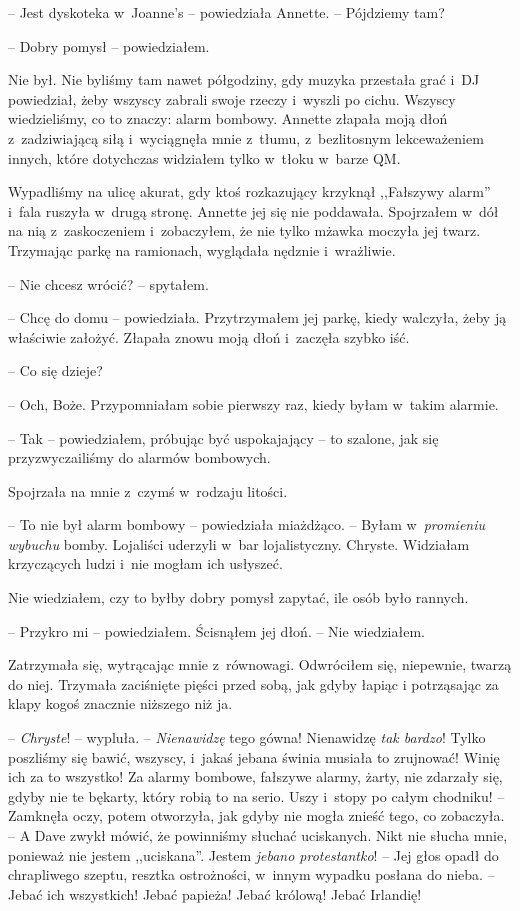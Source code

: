 \documentclass[oneside,polish,11pt,sfheadings]{mwbk}
\begin{document}
-- Jest dyskoteka w~Joanne's -- powiedziała Annette. -- Pójdziemy tam?

-- Dobry pomysł -- powiedziałem.

Nie był. Nie byliśmy tam nawet półgodziny, gdy muzyka przestała grać i~DJ powiedział, żeby wszyscy zabrali swoje rzeczy i~wyszli po cichu.
Wszyscy wiedzieliśmy, co to znaczy: alarm bombowy. Annette złapała moją
dłoń z~zadziwiającą siłą i~wyciągnęła mnie z~tłumu, z~bezlitosnym
lekceważeniem innych, które dotychczas widziałem tylko w~tłoku w~barze
QM.

Wypadliśmy na ulicę akurat, gdy ktoś rozkazujący krzyknął ,,Fałszywy
alarm'' i~fala ruszyła w~drugą stronę. Annette jej się nie poddawała.
Spojrzałem w~dół na nią z~zaskoczeniem i~zobaczyłem, że nie tylko mżawka
moczyła jej twarz. Trzymając parkę na ramionach, wyglądała nędznie i~wrażliwie.

-- Nie chcesz wrócić? -- spytałem.

-- Chcę do domu -- powiedziała. Przytrzymałem jej parkę, kiedy walczyła,
żeby ją właściwie założyć. Złapała znowu moją dłoń i~zaczęła szybko iść.

-- Co się dzieje?

-- Och, Boże. Przypomniałam sobie pierwszy raz, kiedy byłam w~takim
alarmie.

-- Tak -- powiedziałem, próbując być uspokajający -- to szalone, jak się
przyzwyczailiśmy do alarmów bombowych.

Spojrzała na mnie z~czymś w~rodzaju litości.

-- To nie był alarm bombowy -- powiedziała miażdżąco. -- Byłam w~\emph{promieniu wybuchu} bomby. Lojaliści uderzyli w~bar lojalistyczny.
Chryste. Widziałam krzyczących ludzi i~nie mogłam ich usłyszeć.

Nie wiedziałem, czy to byłby dobry pomysł zapytać, ile osób było
rannych.

-- Przykro mi -- powiedziałem. Ścisnąłem jej dłoń. -- Nie wiedziałem.

Zatrzymała się, wytrącając mnie z~równowagi. Odwróciłem się, niepewnie,
twarzą do niej. Trzymała zaciśnięte pięści przed sobą, jak gdyby łapiąc
i potrząsając za klapy kogoś znacznie niższego niż ja.

-- \emph{Chryste}! -- wypluła. -- \emph{Nienawidzę} tego gówna! Nienawidzę
\emph{tak bardzo}! Tylko poszliśmy się bawić, wszyscy, i~jakaś jebana
świnia musiała to zrujnować! Winię ich za to wszystko! Za alarmy
bombowe, fałszywe alarmy, żarty, nie zdarzały się, gdyby nie te bękarty,
który robią to na serio. Uszy i~stopy po całym chodniku! -- Zamknęła
oczy, potem otworzyła, jak gdyby nie mogła znieść tego, co zobaczyła. -- A Dave zwykł mówić, że powinniśmy słuchać uciskanych. Nikt nie słucha
mnie, ponieważ nie jestem ,,uciskana''. Jestem \emph{jebano protestantko}!
-- Jej głos opadł do chrapliwego szeptu, resztka ostrożności, w~innym
wypadku posłana do nieba. -- Jebać ich wszystkich! Jebać papieża! Jebać
królową! Jebać Irlandię!
\end{document}
